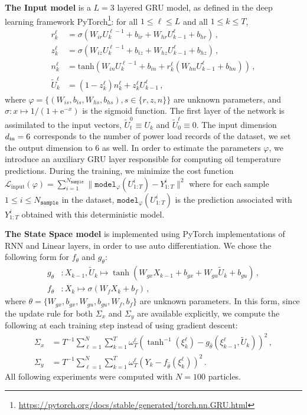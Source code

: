\documentclass[conference]{IEEEtran}
\begin{document}
\textbf{The Input model} is a $L=3$ layered GRU model, as defined in the deep learning framework PyTorch\footnote{\href{https://pytorch.org/docs/stable/generated/torch.nn.GRU.html}{https://pytorch.org/docs/stable/generated/torch.nn.GRU.html}}: for all $1 \leq \ell \leq L$ and all $1 \leq k \leq T$,
\begin{align*}
	r^\ell_k        & = \sigma(W_{ir} U^{\ell - 1}_k + b_{ir} + W_{hr} U^{\ell}_{k-1} + b_{hr}) \,,                \\
	z^\ell_k        & = \sigma(W_{iz} U^{\ell - 1}_k + b_{iz} + W_{hz} U^{\ell}_{k-1} + b_{hz}) \,,                \\
	n^\ell_k        & = \mathrm{tanh}(W_{in} U^{\ell - 1}_k + b_{in} + r^\ell_k (W_{hn} U^\ell_{k-1} + b_{hn}))\,, \\
	\tilde U^\ell_k & = (1-z^\ell_k) n^\ell_k+z^\ell_k U^\ell_{k-1}\,,
\end{align*}
where $\varphi = \{(W_{is}, b_{is}, W_{hs}, b_{hs}), s \in \{r, z, n\}\}$ are unknown parameters, and $\sigma: x \mapsto 1/(1+\mathrm{e}^{-x})$ is the sigmoid function.
The first layer of the network is assimilated to the input vectors, $\widetilde U_t^0 \equiv U_k$ and $\widetilde U^\ell_0 \equiv 0$.
The input dimension $d_\textnormal{in}=6$ corresponds to the number of power load records of the dataset, we set the output dimension to 6 as well.
In order to estimate the parameters $\varphi$, we introduce an auxiliary GRU layer responsible for computing oil temperature predictions.
During the training, we minimize the cost function $\mathcal{L}_{\mathrm{input}}(\varphi) = \sum_{i=1}^{N_{\texttt{sample}}} \|\texttt{model}_{\varphi}(U^i_{1:T}) - Y^i_{1:T}\|^2$ where for each sample $1 \leq i \leq N_{\texttt{sample}}$ in the dataset, $\texttt{model}_\varphi(U^i_{1:T})$ is the prediction associated with $Y^i_{1:T}$ obtained with this deterministic model.

\textbf{The State Space model} is implemented using PyTorch implementations of  RNN and Linear layers, in order to use auto differentiation.
We chose the following form for $f_\theta$ and $g_\theta$:
\begin{align*}
	g_\theta & : X_{k-1}, \widetilde U_k \mapsto \tanh(W_{gx} X_{k-1} + b_{gx} + W_{gu} \widetilde U_k + b_{gu})\,, \\
	f_\theta & : X_k \mapsto  \sigma(W_f X_k + b_f)\,,
\end{align*}
where $\theta = \{W_{gx}, b_{gx}, W_{gu}, b_{gu}, W_f, b_f\}$ are unknown parameters.
In this form, since the update rule for both $\Sigma_x$ and $\Sigma_y$ are available explicitly, we compute the following at each training step instead of using gradient descent:
\begin{align*}
	\Sigma_x & = T^{-1} \sum_{\ell=1}^N \sum_{k=1}^T \omega_T^\ell (\tanh^{-1}(\xi_k^\ell) - g_{\hat \theta}(\xi^\ell_{k-1}, \widetilde U_k))^2\,, \\
	\Sigma_y & = T^{-1} \sum_{\ell=1}^N \sum_{k=1}^T \omega_T^\ell (Y_k - f_{\hat \theta}(\xi^\ell_k))^2 \,.
\end{align*}
All following experiments were computed with $N=100$ particles.
\end{document}
